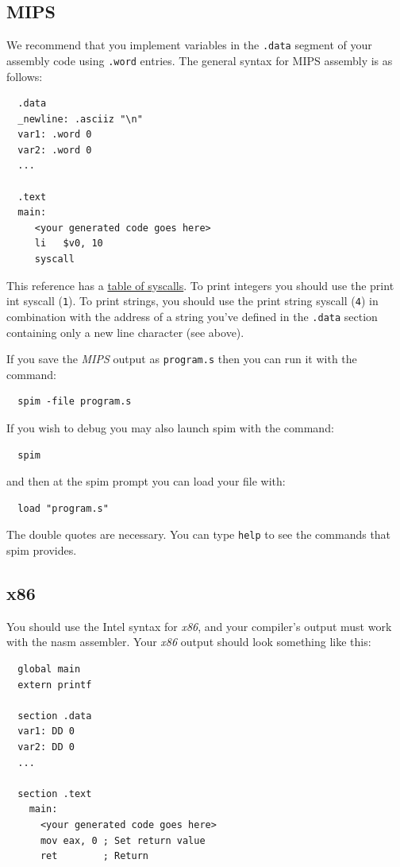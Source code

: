 \documentclass{article}
\newcommand{\code}[1]{\texttt{\textmd{#1}}}
\begin{document}
\subsection{MIPS}
We recommend that you implement variables in the \code{.data} segment of your assembly code using
\code{.word} entries. The general syntax for MIPS assembly is as follows:

\begin{lstlisting}
  .data
  _newline: .asciiz "\n"
  var1: .word 0
  var2: .word 0
  ...

  .text
  main:
     <your generated code goes here>
     li   $v0, 10
     syscall
\end{lstlisting}

This reference has a \href{http://students.cs.tamu.edu/tanzir/csce350/reference/syscalls.html}
{table of syscalls}. To print integers you should use the print int syscall (\code{1}). To print
strings, you should use the print string syscall (\code{4}) in combination with the address of a
string you've defined in the \code{.data} section containing only a new line character (see above).

If you save the \textit{MIPS} output as \code{program.s} then you can run it with the command:
\begin{lstlisting}
  spim -file program.s
\end{lstlisting}

If you wish to debug you may also launch spim with the command:
\begin{lstlisting}
  spim
\end{lstlisting}
and then at the spim prompt you can load your file with:
\begin{lstlisting}
  load "program.s"
\end{lstlisting}
The double quotes are necessary. You can type \texttt{help} to see the commands that spim provides.

\subsection{x86}
You should use the Intel syntax for \textit{x86}, and your compiler's output must work with the
nasm assembler. Your \textit{x86} output should look something like this:

\begin{lstlisting}
  global main
  extern printf

  section .data
  var1: DD 0
  var2: DD 0
  ...

  section .text
    main:
      <your generated code goes here>
      mov eax, 0 ; Set return value
      ret        ; Return
\end{lstlisting}
\end{document}
